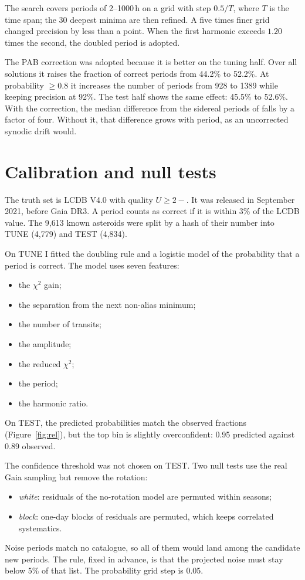 \documentclass[twocolumn]{aastex631}
\begin{document}
The search covers periods of 2--1000\,h on a grid with step $0.5/T$, where $T$ is the time span; the 30
deepest minima are then refined. A five times finer grid changed precision by less than a point. When the
first harmonic exceeds $1.20$ times the second, the doubled period is adopted.

The PAB correction was adopted because it is better on the tuning half. Over all solutions it raises the
fraction of correct periods from 44.2\% to 52.2\%. At probability $\ge0.8$ it increases the number of
periods from 928 to 1389 while keeping precision at 92\%. The test half shows the same effect: 45.5\% to
52.6\%. With the correction, the median difference from the sidereal periods of \citet{Durech2023} falls
by a factor of four. Without it, that difference grows with period, as an uncorrected synodic drift would.

\section{Calibration and null tests}

The truth set is LCDB V4.0 \citep{Warner2009,Warner2021} with quality $U\ge2-$. It was released in
September 2021, before Gaia DR3. A period counts as correct if it is within 3\% of the LCDB value. The
9{,}613 known asteroids were split by a hash of their number into TUNE (4{,}779) and TEST (4{,}834).

On TUNE I fitted the doubling rule and a logistic model of the probability that a period is correct. The
model uses seven features:
\begin{itemize}
\item the $\chi^2$ gain;
\item the separation from the next non-alias minimum;
\item the number of transits;
\item the amplitude;
\item the reduced $\chi^2$;
\item the period;
\item the harmonic ratio.
\end{itemize}
On TEST, the predicted probabilities match the observed fractions (Figure~\ref{fig:rel}), but the top bin is
slightly overconfident: 0.95 predicted against 0.89 observed.

The confidence threshold was not chosen on TEST. Two null tests use the real Gaia sampling but remove the
rotation:
\begin{itemize}
\item \emph{white}: residuals of the no-rotation model are permuted within seasons;
\item \emph{block}: one-day blocks of residuals are permuted, which keeps correlated systematics.
\end{itemize}
Noise periods match no catalogue, so all of them would land among the candidate new periods. The rule,
fixed in advance, is that the projected noise must stay below 5\% of that list. The probability grid
step is 0.05.
\end{document}
